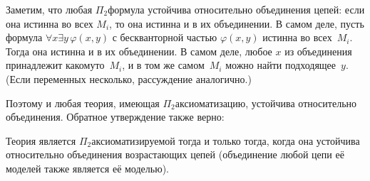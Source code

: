 Заметим, что любая $\Pi_2$\д формула устойчива относительно
объединения цепей: если она истинна во всех $M_i$, то она
истинна и в их объединении. В самом деле, пусть формула $\forall
x \exists y\, \varphi(x,y)$ с бескванторной частью
$\varphi(x,y)$ истинна во всех~$M_i$. Тогда она истинна и в их
объединении. В самом деле, любое $x$ из объединения принадлежит
какому\д то~$M_i$, и в том же самом~$M_i$ можно найти
подходящее~$y$. (Если переменных несколько, рассуждение
аналогично.)

Поэтому и любая теория, имеющая $\Pi_2$\д аксиоматизацию,
устойчива относительно объединения. Обратное утверждение также
верно:

\begin{theorem}
%
%
%
%
Теория является $\Pi_2$\Д аксиоматизируемой тогда и только
тогда, когда она устойчива относительно объединения возрастающих
цепей (объединение любой цепи её моделей также является
её моделью).
\end{theorem}

